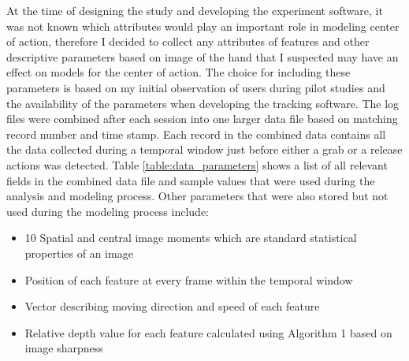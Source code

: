 At the time of designing the study and developing the experiment software, it was not known which attributes would play an important role in modeling center of action, therefore I decided to collect any attributes of features and other descriptive parameters based on image of the hand that I suspected may have an effect on models for the center of action.
The choice for including these parameters is based on my initial observation of users during pilot studies and the availability of the parameters when developing the tracking software.
The log files were combined after each session into one larger data file based on matching record number and time stamp.
Each record in the combined data contains all the data collected during a
temporal window just before either a grab or a release actions was detected.
Table \ref{table:data_parameters} shows a list of all relevant fields in the combined data file and sample values that were used during the analysis and modeling process.
Other parameters that were also stored but not used during the modeling process include:
\begin{itemize}
 \item 10 Spatial and central image moments which are standard statistical properties of an image
 \item Position of each feature at every frame within the temporal window
 \item Vector describing moving direction and speed of each feature
 \item Relative depth value for each feature calculated using Algorithm 1 based on image sharpness
\end{itemize}
